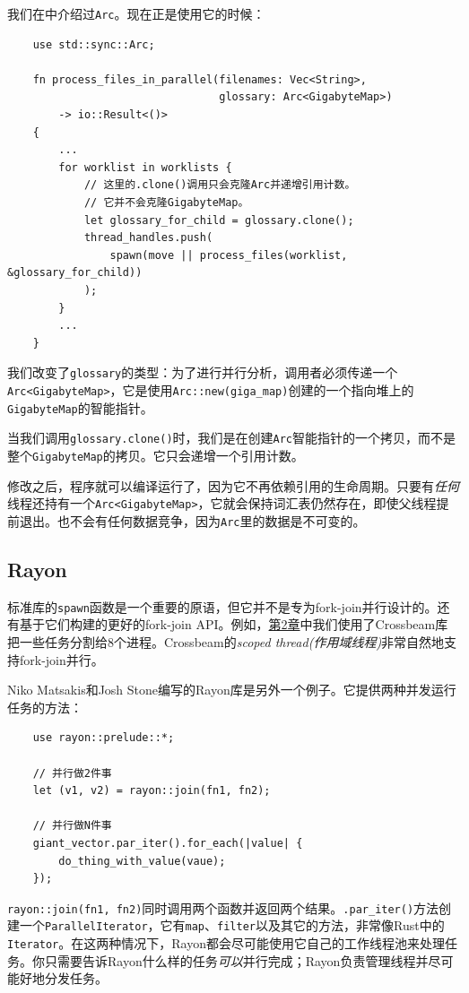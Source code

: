 我们在中介绍过\texttt{Arc}。现在正是使用它的时候：
\begin{verbatim}
    use std::sync::Arc;

    fn process_files_in_parallel(filenames: Vec<String>,
                                 glossary: Arc<GigabyteMap>)
        -> io::Result<()>
    {
        ...
        for worklist in worklists {
            // 这里的.clone()调用只会克隆Arc并递增引用计数。
            // 它并不会克隆GigabyteMap。
            let glossary_for_child = glossary.clone();
            thread_handles.push(
                spawn(move || process_files(worklist, &glossary_for_child))
            );
        }
        ...
    }
\end{verbatim}

我们改变了\texttt{glossary}的类型：为了进行并行分析，调用者必须传递一个\texttt{Arc<GigabyteMap>}，它是使用\texttt{Arc::new(giga\_map)}创建的一个指向堆上的\texttt{GigabyteMap}的智能指针。

当我们调用\texttt{glossary.clone()}时，我们是在创建\texttt{Arc}智能指针的一个拷贝，而不是整个\texttt{GigabyteMap}的拷贝。它只会递增一个引用计数。

修改之后，程序就可以编译运行了，因为它不再依赖引用的生命周期。只要有\emph{任何}线程还持有一个\texttt{Arc<GigabyteMap>}，它就会保持词汇表仍然存在，即使父线程提前退出。也不会有任何数据竞争，因为\texttt{Arc}里的数据是不可变的。

\subsection{Rayon}

标准库的\texttt{spawn}函数是一个重要的原语，但它并不是专为fork-join并行设计的。还有基于它们构建的更好的fork-join API。例如，\hyperref[ch02]{第2章}中我们使用了Crossbeam库把一些任务分割给8个进程。Crossbeam的\emph{scoped thread(作用域线程)}非常自然地支持fork-join并行。

Niko Matsakis和Josh Stone编写的Rayon库是另外一个例子。它提供两种并发运行任务的方法：
\begin{verbatim}
    use rayon::prelude::*;

    // 并行做2件事
    let (v1, v2) = rayon::join(fn1, fn2);

    // 并行做N件事
    giant_vector.par_iter().for_each(|value| {
        do_thing_with_value(vaue);
    });
\end{verbatim}

\texttt{rayon::join(fn1, fn2)}同时调用两个函数并返回两个结果。\texttt{.par\_iter()}方法创建一个\texttt{ParallelIterator}，它有\texttt{map}、\texttt{filter}以及其它的方法，非常像Rust中的\texttt{Iterator}。在这两种情况下，Rayon都会尽可能使用它自己的工作线程池来处理任务。你只需要告诉Rayon什么样的任务\emph{可以}并行完成；Rayon负责管理线程并尽可能好地分发任务。

